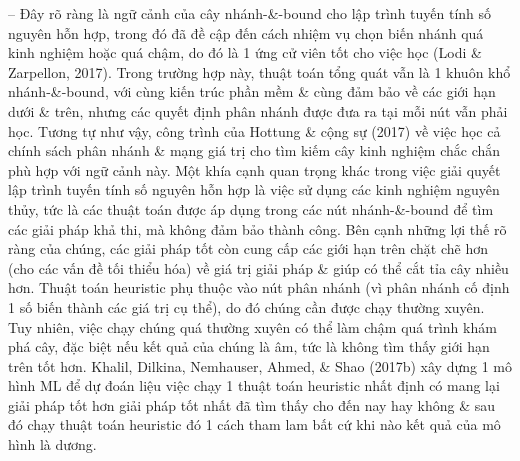 \documentclass{article}
\begin{document}
\begin{itemize}
\begin{itemize}
\begin{itemize}
            -- Đây rõ ràng là ngữ cảnh của cây nhánh-\&-bound cho lập trình tuyến tính số nguyên hỗn hợp, trong đó đã đề cập đến cách nhiệm vụ chọn biến nhánh quá kinh nghiệm hoặc quá chậm, do đó là 1 ứng cử viên tốt cho việc học (Lodi \& Zarpellon, 2017). Trong trường hợp này, thuật toán tổng quát vẫn là 1 khuôn khổ nhánh-\&-bound, với cùng kiến trúc phần mềm \& cùng đảm bảo về các giới hạn dưới \& trên, nhưng các quyết định phân nhánh được đưa ra tại mỗi nút vẫn phải học. Tương tự như vậy, công trình của Hottung \& cộng sự (2017) về việc học cả chính sách phân nhánh \& mạng giá trị cho tìm kiếm cây kinh nghiệm chắc chắn phù hợp với ngữ cảnh này. Một khía cạnh quan trọng khác trong việc giải quyết lập trình tuyến tính số nguyên hỗn hợp là việc sử dụng các kinh nghiệm nguyên thủy, tức là các thuật toán được áp dụng trong các nút nhánh-\&-bound để tìm các giải pháp khả thi, mà không đảm bảo thành công. Bên cạnh những lợi thế rõ ràng của chúng, các giải pháp tốt còn cung cấp các giới hạn trên chặt chẽ hơn (cho các vấn đề tối thiểu hóa) về giá trị giải pháp \& giúp có thể cắt tỉa cây nhiều hơn. Thuật toán heuristic phụ thuộc vào nút phân nhánh (vì phân nhánh cố định 1 số biến thành các giá trị cụ thể), do đó chúng cần được chạy thường xuyên. Tuy nhiên, việc chạy chúng quá thường xuyên có thể làm chậm quá trình khám phá cây, đặc biệt nếu kết quả của chúng là âm, tức là không tìm thấy giới hạn trên tốt hơn. Khalil, Dilkina, Nemhauser, Ahmed, \& Shao (2017b) xây dựng 1 mô hình ML để dự đoán liệu việc chạy 1 thuật toán heuristic nhất định có mang lại giải pháp tốt hơn giải pháp tốt nhất đã tìm thấy cho đến nay hay không \& sau đó chạy thuật toán heuristic đó 1 cách tham lam bất cứ khi nào kết quả của mô hình là dương.


\end{itemize}
\end{itemize}
\end{itemize}
\end{document}
